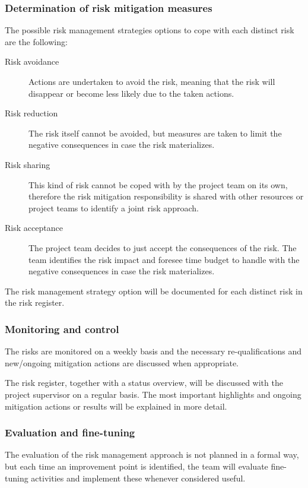 \subsubsection{Determination of risk mitigation measures}
The possible risk management strategies options to cope with each distinct risk are the following:
\begin{description}
	\item [Risk avoidance]
	Actions are undertaken to avoid the risk, meaning that the risk will disappear or become less likely due to the taken actions.
	\item[Risk reduction]
	The risk itself cannot be avoided, but measures are taken to limit the negative consequences in case the risk materializes.
	\item[Risk sharing]
	This kind of risk cannot be coped with by the project team on its own, therefore the risk mitigation responsibility is shared with other resources or project teams to identify a joint risk approach.
	\item[Risk acceptance]
	The project team decides to just accept the consequences of the risk.
	The team identifies the risk impact and foresee time budget to handle with the negative consequences in case the risk materializes.
\end {description}

\noindent
The risk management strategy option will be documented for each distinct risk in the risk register.

\subsubsection{Monitoring and control}
The risks are monitored on a weekly basis and the necessary re-qualifications and new/ongoing mitigation actions are discussed when appropriate.

The risk register, together with a status overview, will be discussed with the project supervisor on a regular basis.
The most important highlights and ongoing mitigation actions or results will be explained in more detail.

\subsubsection{Evaluation and fine-tuning}
The evaluation of the risk management approach is not planned in a formal way, but each time an improvement point is identified, the team will evaluate fine-tuning activities and implement these whenever considered useful.
